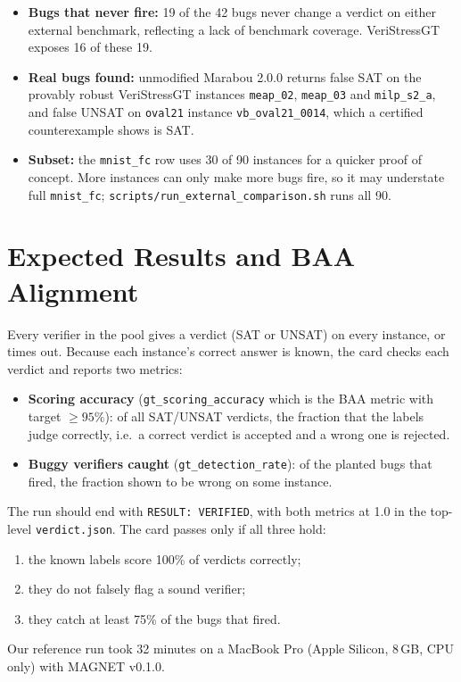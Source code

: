 \documentclass[11pt]{article}
\newcommand{\code}[1]{\texttt{#1}}
\begin{document}
\begin{itemize}
  \item \textbf{Bugs that never fire:} 19 of the 42 bugs never change a verdict on either external
  benchmark, reflecting a lack of benchmark coverage. VeriStressGT exposes 16 of these 19.
  \item \textbf{Real bugs found:} unmodified Marabou 2.0.0 returns false SAT on the provably robust
  VeriStressGT instances \code{meap\_02}, \code{meap\_03} and \code{milp\_s2\_a}, and false UNSAT
  on \code{oval21} instance \code{vb\_oval21\_0014}, which a certified counterexample shows is SAT.
  \item \textbf{Subset:} the \code{mnist\_fc} row uses 30 of 90 instances for a quicker proof of
  concept. More instances can only make more bugs fire, so it may understate full \code{mnist\_fc}; \code{scripts/run\_external\_comparison.sh} runs all 90.
\end{itemize}

\section{Expected Results and BAA Alignment}
Every verifier in the pool gives a verdict (SAT or UNSAT) on every instance, or times out. Because
each instance's correct answer is known, the card checks each verdict and reports two metrics:
\begin{itemize}
  \item \textbf{Scoring accuracy} (\code{gt\_scoring\_accuracy} which is the BAA metric with target
  $\geq 95\%$): of all SAT/UNSAT verdicts, the fraction that the labels judge correctly, i.e.\
  a correct verdict is accepted and a wrong one is rejected.
  \item \textbf{Buggy verifiers caught} (\code{gt\_detection\_rate}): of the planted bugs that
  fired, the fraction shown to be wrong on some instance.
\end{itemize}

The run should end with \code{RESULT: VERIFIED}, with both metrics at 1.0 in the top-level
\code{verdict.json}. The card passes only if all three hold:
\begin{enumerate}
  \item the known labels score 100\% of verdicts correctly;
  \item they do not falsely flag a sound verifier;
  \item they catch at least 75\% of the bugs that fired.
\end{enumerate}
Our reference run took
32 minutes on a MacBook Pro (Apple Silicon, 8\,GB, CPU only) with MAGNET v0.1.0. 
\end{document}
